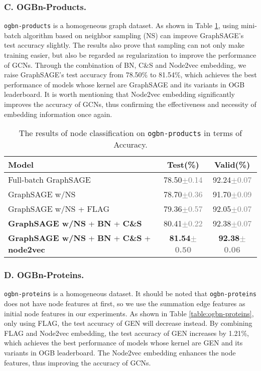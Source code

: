 \documentclass[runningheads]{llncs}
\newcommand{\std}[1]{\textcolor{gray}{\scriptsize{$\pm$#1}}}
\begin{document}
\subsubsection{C. OGBn-Products.}
\texttt{ogbn-products} is a homogeneous graph dataset. As shown in
Table \ref{table:ogbn-products}, using mini-batch algorithm based on neighbor sampling (NS) can
improve GraphSAGE's test accuracy slightly. The results also prove that sampling can
not only make training easier, but also be regarded as regularization
to improve the performance of GCNs. 
Through the combination of BN, C\&S and Node2vec embedding, we raise GraphSAGE's test accuracy from 78.50\% to 81.54\%, which achieves the best performance of models whose kernel are GraphSAGE and its variants in OGB leaderboard. It is worth mentioning that Node2vec
embedding significantly improves the accuracy of GCNs, thus confirming the effectiveness and necessity of embedding
information once again.

\begin{table}[htbp] 
\caption{The results of node classification on \texttt{ogbn-products} in terms of Accuracy. }
\label{table:ogbn-products}
\begin{center}
\renewcommand\tabcolsep{5.0pt}
\begin{tabular}{l|c|c}
\hline
\textbf{Model}  & \textbf{Test(\%)} & \textbf{Valid(\%)}  \\
\hline
\hline
Full-batch GraphSAGE \cite{hamilton2017inductive}& 78.50\std{0.14} & 92.24\std{0.07} \\
GraphSAGE w/NS & 78.70\std{0.36} & 91.70\std{0.09} \\
GraphSAGE w/NS + FLAG & 79.36\std{0.57} & 92.05\std{0.07} \\
\hline
\hline
\textbf{GraphSAGE w/NS} + \textbf{BN} + \textbf{C\&S} & 80.41\std{0.22} & 92.38\std{0.07} \\
\textbf{GraphSAGE w/NS} + \textbf{BN} + \textbf{C\&S} + \textbf{node2vec} & \textbf{81.54\std{0.50}} &
\textbf{92.38\std{0.06}} \\
\hline
\end{tabular}
\end{center} 
\end{table}




\subsubsection{D. OGBn-Proteins.}
\texttt{ogbn-proteins} is a homogeneous dataset. It
should be noted that \texttt{ogbn-proteins} does not have node features at first, so we use the summation edge features as initial node features in our experiments.
As shown in Table \ref{table:ogbn-proteins}, only using FLAG, the
test accuracy of GEN \cite{li2020deepergcn,li2019deepgcns} will decrease instead. By combining FLAG and Node2vec embedding, the test accuracy of
GEN increases by 1.21\%, which achieves the best performance of models whose kernel are GEN and its variants in OGB leaderboard. The Node2vec embedding enhances the node features,
thus improving the accuracy of GCNs.
\end{document}
